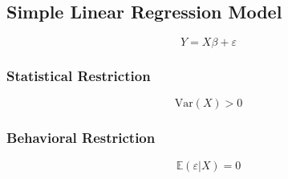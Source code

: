 \documentclass[20pt]{extarticle}
\begin{document}

\subsection*{Simple Linear Regression Model}

$$Y = X\beta + \varepsilon$$

\subsubsection*{Statistical Restriction}

$$\text{Var}(X) > 0$$

\subsubsection*{Behavioral Restriction}

$$\mathbb{E}(\varepsilon|X) = 0$$
\end{document}
